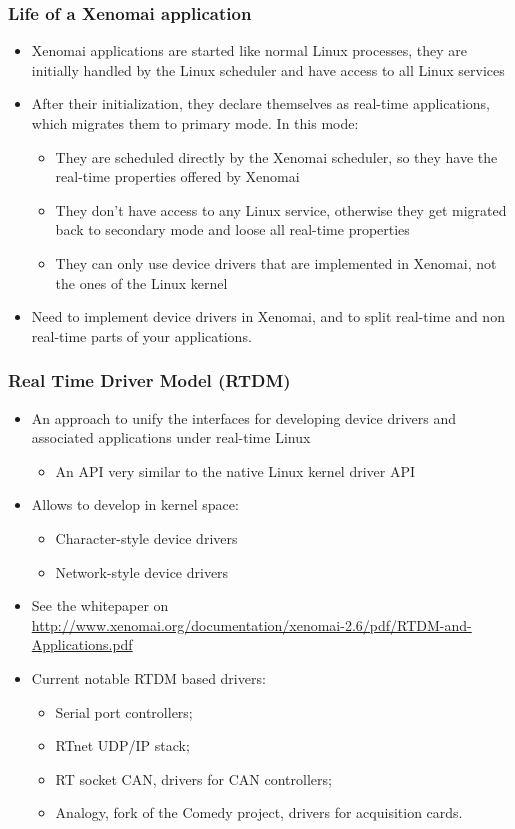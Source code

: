 \begin{frame}
  \frametitle{Life of a Xenomai application}
  \begin{itemize}
  \item Xenomai applications are started like normal Linux processes,
    they are initially handled by the Linux scheduler and have access
    to all Linux services
  \item After their initialization, they declare themselves as
    real-time applications, which migrates them to primary mode. In
    this mode:
    \begin{itemize}
    \item They are scheduled directly by the Xenomai scheduler, so
      they have the real-time properties offered by Xenomai
    \item They don't have access to any Linux service, otherwise they
      get migrated back to secondary mode and loose all real-time
      properties
    \item They can only use device drivers that are implemented in
      Xenomai, not the ones of the Linux kernel
    \end{itemize}
  \item Need to implement device drivers in Xenomai, and to split
    real-time and non real-time parts of your applications.
  \end{itemize}
\end{frame}

\begin{frame}
  \frametitle{Real Time Driver Model (RTDM)}
  \begin{itemize}
  \item An approach to unify the interfaces for developing device
    drivers and associated applications under real-time Linux
    \begin{itemize}
    \item An API very similar to the native Linux kernel driver API
    \end{itemize}
  \item Allows to develop in kernel space:
    \begin{itemize}
    \item Character-style device drivers
    \item Network-style device drivers
    \end{itemize}
  \item See the whitepaper on\\
    \url{http://www.xenomai.org/documentation/xenomai-2.6/pdf/RTDM-and-Applications.pdf}
  \item Current notable RTDM based drivers:
    \begin{itemize}
    \item Serial port controllers;
    \item RTnet UDP/IP stack;
    \item RT socket CAN, drivers for CAN controllers;
    \item Analogy, fork of the Comedy project, drivers for acquisition cards.
    \end{itemize}
  \end{itemize}
\end{frame}

